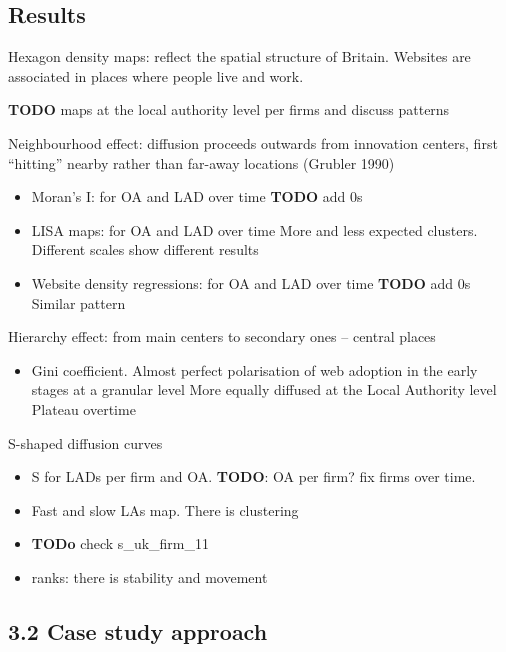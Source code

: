 \documentclass[
  authoryear,
  preprint,
  3p]{elsarticle}
\providecommand{\tightlist}{%
  \setlength{\itemsep}{0pt}\setlength{\parskip}{0pt}}\usepackage{longtable,booktabs,array}
\begin{document}
\hypertarget{sec3.1}{%
\subsection{Results}\label{sec3.1}}

Hexagon density maps: reflect the spatial structure of Britain. Websites
are associated in places where people live and work.

\textbf{TODO} maps at the local authority level per firms and discuss
patterns

Neighbourhood effect: diffusion proceeds outwards from innovation
centers, first ``hitting'' nearby rather than far-away locations
(Grubler 1990)

\begin{itemize}
\item
  Moran's I: for OA and LAD over time \textbf{TODO} add 0s
\item
  LISA maps: for OA and LAD over time More and less expected clusters.
  Different scales show different results
\item
  Website density regressions: for OA and LAD over time \textbf{TODO}
  add 0s Similar pattern
\end{itemize}

Hierarchy effect: from main centers to secondary ones -- central places

\begin{itemize}
\tightlist
\item
  Gini coefficient. Almost perfect polarisation of web adoption in the
  early stages at a granular level More equally diffused at the Local
  Authority level Plateau overtime
\end{itemize}

S-shaped diffusion curves

\begin{itemize}
\item
  S for LADs per firm and OA. \textbf{TODO}: OA per firm? fix firms over
  time.
\item
  Fast and slow LAs map. There is clustering
\item
  \textbf{TODo} check s\_uk\_firm\_11
\item
  ranks: there is stability and movement
\end{itemize}

\hypertarget{sec3.2}{%
\subsection{3.2 Case study approach}\label{sec3.2}}
\end{document}
